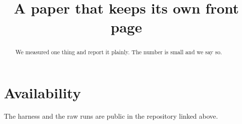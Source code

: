 \documentclass[sigconf,screen]{acmart}
\begin{document}
\title{A paper that keeps its own front page}

\begin{abstract}
We measured one thing and report it plainly. The number is small and we say so.
\end{abstract}

\section{Availability}
The harness and the raw runs are public in the repository linked above.
\end{document}

